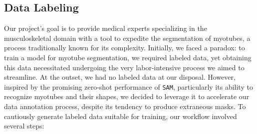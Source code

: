 \subsection{Data Labeling}

Our project's goal is to provide medical experts specializing in the musculoskeletal domain with a tool to expedite the segmentation of myotubes, a process traditionally known for its complexity. Initially, we faced a paradox: to train a model for myotube segmentation, we required labeled data, yet obtaining this data necessitated undergoing the very labor-intensive process we aimed to streamline. At the outset, we had no labeled data at our disposal. However, inspired by the promising zero-shot performance of \texttt{SAM}, particularly its ability to recognize myotubes and their shapes, we decided to leverage it to accelerate our data annotation process, despite its tendency to produce extraneous masks. To cautiously generate labeled data suitable for training, our workflow involved several steps:

